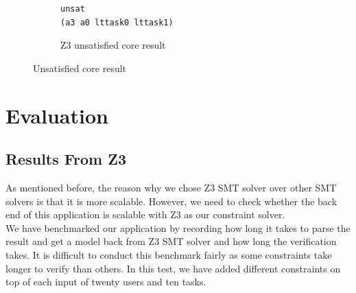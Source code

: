 \documentclass[a4paper]{report}
\begin{document}
\clearpage
\begin{figure}
\begin{subfigure}[H]{\textwidth}
\ContinuedFloat
\begin{lstlisting}[frame=single]
unsat
(a3 a0 lttask0 lttask1)
\end{lstlisting}
\caption{Z3 unsatisfied core result}
\label{fig:Z3 unsatisfied core result}
\end{subfigure}
\caption{Unsatisfied core result}
\label{fig:Unsatisfied core result}
\end{figure}

\chapter{Evaluation}
\section{Results From Z3}
As mentioned before, the reason why we chose Z3 SMT solver over other SMT solvers is that it is more scalable\cite{SMTBenchmark}. However, we need to check whether the back end of this application is scalable with Z3 as our constraint solver. \\

We have benchmarked our application by recording how long it takes to parse the result and get a model back from Z3 SMT solver and how long the verification takes. It is difficult to conduct this benchmark fairly as some constraints take longer to verify than others. In this test, we have added different constraints on top of each input of twenty users and ten tasks. \\
\end{document}
